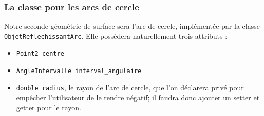 \documentclass{book}
\newcommand{\inline}[1]{\texttt{#1}}
\begin{document}
\subsubsection{La classe pour les arcs de cercle}

Notre seconde géométrie de surface sera l'arc de cercle, implémentée par la classe \inline{ObjetReflechissantArc}. Elle possèdera naturellement trois attributs :
\begin{itemize}
  \item \inline{Point2 centre}
  \item \inline{AngleIntervalle interval_angulaire}
  \item \inline{double radius}, le rayon de l'arc de cercle, que l'on déclarera privé pour empêcher l'utilisateur de le rendre négatif; il faudra donc ajouter un setter et getter pour le rayon.
\end{itemize}
\end{document}
